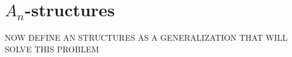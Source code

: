 \documentclass{beamer}
\theoremstyle{definition}
\begin{document}
\section{$A_n$-structures}
\begin{frame}
NOW DEFINE AN STRUCTURES AS A GENERALIZATION THAT WILL SOLVE THIS PROBLEM
\end{frame}
%
%		
\end{document}
